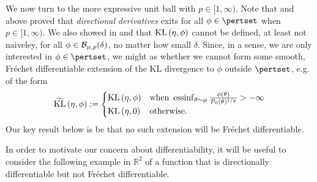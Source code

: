 We now turn to the more expressive unit ball with $p \in [1, \infty)$. Note that
 and  above proved that {\em
directional derivatives} exits for all $\phi \in \pertset$ when $p \in [1,
\infty)$.  We also showed in  and 
that $\mathrm{KL}\left(\eta, \phi\right)$ cannot be defined, at least not naiveley, for all $\phi
\in \mathcal{B}_{\mu,p}(\delta)$, no matter how small $\delta$. Since, in a sense, we
are only interested in $\phi \in \pertset$, we might as whether we cannot form
some smooth, Fr{\'e}chet differentiable extension of the KL divergence to $\phi$
outside $\pertset$, e.g. of the form
%
\begin{align*}
%
\KLhat{\eta, \phi} :=
\begin{cases}
    \KL{\eta, \phi} & \textrm{when }\essinf_{\theta \sim \mu}
        \frac{\phi(\theta)}{\pbase(\theta)^{1/p}} > -\infty\\
    \KL{\eta, \phiz} & \textrm{otherwise}.
\end{cases}
%
\end{align*}
%
Our key result below is be that no such extension will be Fr{\'e}chet
differentiable.

In order to motivate our concern about differentiability, it will be useful to
consider the following example in $\mathbb{R}^2$ of a function that is
directionally differentiable but not Fr{\'e}chet differentiable.


